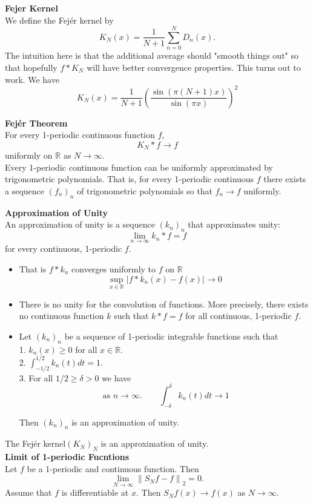 \documentclass[a4paper, 10pt]{article}
\begin{document}
\begin{multicols*}{3}
\textbf{Fejer Kernel}\\
We define the Fejér kernel by
$$
K_N(x)=\frac{1}{N+1} \sum_{n=0}^N D_n(x) .
$$
The intuition here is that the additional average should "smooth things out" so that hopefully $f * K_N$ will have better convergence properties. This turns out to work.
We have
$$
K_N(x) = \frac{1}{N+1}\left(\frac{\sin (\pi(N+1) x)}{\sin (\pi x)}\right)^2
$$

\textbf{Fejér Theorem}\\
For every 1-periodic continuous function $f$,
$$
K_N * f \rightarrow f
$$
uniformly on $\mathbb{R}$ as $N \rightarrow \infty$.\\
Every 1-periodic continuous function can be uniformly approximated by trigonometric polynomials. That is, for every 1-periodic continuous $f$ there exists a sequence $\left(f_n\right)_n$ of trigonometric polynomials so that $f_n \rightarrow f$ uniformly.

\textbf{Approximation of Unity}\\
An approximation of unity is a sequence $\left(k_n\right)_n$ that approximates unity:
$$
\lim _{n \rightarrow \infty} k_n * f=f
$$
for every continuous, 1-periodic $f$. 
\begin{itemize}[label=\textbullet, labelsep=0.3em, leftmargin=1em]
	\item
That is $f * k_n$ converges uniformly to $f$ on $\mathbb{R}$
$$
\sup _{x \in \mathbb{R}}\left|f * k_n(x)-f(x)\right| \rightarrow 0
$$
\item
There is no unity for the convolution of functions. More precisely, there exists no continuous function $k$ such that $k * f=f$ for all continuous, 1-periodic $f$.
\item
Let $\left(k_n\right)_n$ be a sequence of 1-periodic integrable functions such that\\
1. $k_n(x) \geq 0$ for all $x \in \mathbb{R}$.\\
2. $\int_{-1 / 2}^{1 / 2} k_n(t) d t=1$.\\
3. For all $1 / 2 \geq \delta>0$ we have
$$
\text { as } n \rightarrow \infty . \quad \quad \int_{-\delta}^\delta k_n(t) d t \rightarrow 1
$$

Then $\left(k_n\right)_n$ is an approximation of unity.

\end{itemize}
The Fejér kernel$\left(K_N\right)_N$ is an approximation of unity.\\

\textbf{Limit of 1-periodic Fucntions}\\
Let $f$ be a 1-periodic and continuous function. Then
$$
\lim _{N \rightarrow \infty}\left\|S_N f-f\right\|_2=0 .
$$
Assume that $f$ is differentiable at $x$. Then $S_N f(x) \rightarrow f(x)$ as $N \rightarrow \infty$.


\end{multicols*}
\end{document}
